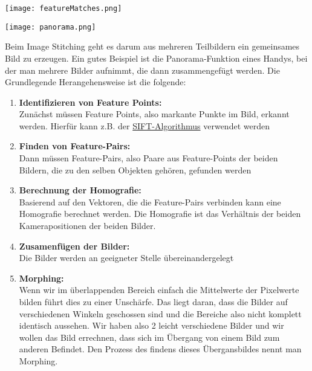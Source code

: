 \texttt{[image: featureMatches.png]}

\texttt{[image: panorama.png]}

Beim Image Stitching geht es darum aus mehreren Teilbildern ein gemeinsames Bild zu erzeugen. Ein gutes Beispiel ist die Panorama-Funktion eines Handys, bei der man mehrere Bilder aufnimmt, die dann zusammengefügt werden. Die Grundlegende Herangehensweise ist die folgende:

\begin{enumerate}
    \item \textbf{Identifizieren von Feature Points:}\\
          Zunächst müssen Feature Points, also markante Punkte im Bild, erkannt werden. Hierfür kann z.B. der \hyperref[sec:sift]{SIFT-Algorithmus} verwendet werden
    \item \textbf{Finden von Feature-Pairs:}\\
          Dann müssen Feature-Pairs, also Paare aus Feature-Points der beiden Bildern, die zu den selben Objekten gehören, gefunden werden
    \item \textbf{Berechnung der Homografie:}\\
          Basierend auf den Vektoren, die die Feature-Pairs verbinden kann eine Homografie berechnet werden. Die Homografie ist das Verhältnis der beiden Kamerapositionen der beiden Bilder.
    \item \textbf{Zusamenfügen der Bilder:}\\
          Die Bilder werden an geeigneter Stelle übereinandergelegt
    \item \textbf{Morphing:}\\
          Wenn wir im überlappenden Bereich einfach die Mittelwerte der Pixelwerte bilden führt dies zu einer Unschärfe. Das liegt daran, dass die Bilder auf verschiedenen Winkeln geschossen sind und die Bereiche also nicht komplett identisch aussehen. Wir haben also 2 leicht verschiedene Bilder und wir wollen das Bild errechnen, dass sich im Übergang von einem Bild zum anderen Befindet. Den Prozess des findens dieses Übergansbildes nennt man Morphing.
\end{enumerate}